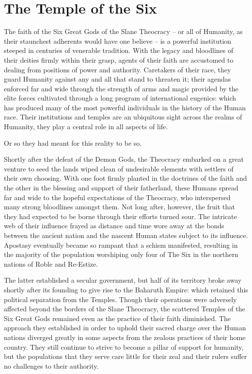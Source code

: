 
\section*{The Temple of the Six}

The faith of the Six Great Gods of the Slane Theocracy – or all of Humanity, as their staunchest adherents would have one believe – is a powerful institution steeped in centuries of venerable tradition. With the legacy and bloodlines of their deities firmly within their grasp, agents of their faith are accustomed to dealing from positions of power and authority. Caretakers of their race, they guard Humanity against any and all that stand to threaten it; their agendas enforced far and wide through the strength of arms and magic provided by the elite forces cultivated through a long program of international eugenics: which has produced many of the most powerful individuals in the history of the Human race. Their institutions and temples are an ubiquitous sight across the realms of Humanity, they play a central role in all aspects of life.

 

Or so they had meant for this reality to be so.

 

Shortly after the defeat of the Demon Gods, the Theocracy embarked on a great venture to seed the lands wiped clean of undesirable elements with settlers of their own choosing. With one foot firmly planted in the doctrines of the faith and the other in the blessing and support of their fatherland, these Humans spread far and wide to the hopeful expectations of the Theocracy, who interspersed many strong bloodlines amongst them. Not long after, however, the fruit that they had expected to be borne through their efforts turned sour. The intricate web of their influence frayed as distance and time wore away at the bonds between the ancient nation and the nascent Human states subject to its influence. Apostasy eventually became so rampant that a schism manifested, resulting in the majority of the population worshiping only four of The Six in the northern nations of Roble and Re-Estize.

 

The latter established a secular government, but half of its territory broke away shortly after its founding to give rise to the Baharuth Empire: which retained this political separation from the Temples. Though their operations were adversely affected beyond the borders of the Slane Theocracy, the scattered Temples of the Six Great Gods remained even as the practice of their faith diminished. The approach they established in order to uphold their sacred charge over the Human nations diverged greatly in some aspects from the zealous practices of their home country. They still continue to strive to become a pillar of support for humanity, but the populations that they serve care little for their zeal and their rulers suffer no challenges to their authority.

